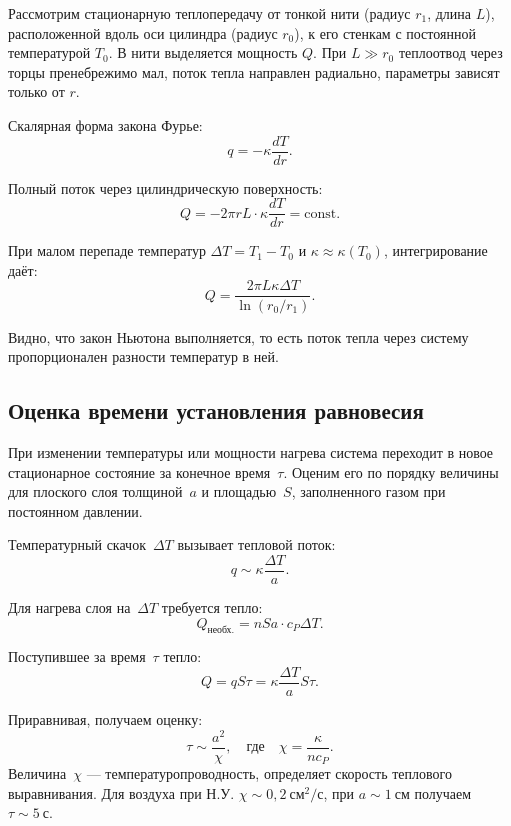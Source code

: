 \documentclass[a4paper,12pt]{article} %
\begin{document}
\medskip

Рассмотрим стационарную теплопередачу от тонкой нити (радиус $r_1$, длина $L$), расположенной вдоль оси цилиндра (радиус $r_0$), к его стенкам с постоянной температурой $T_0$. В нити выделяется мощность $Q$. При $L \gg r_0$ теплоотвод через торцы пренебрежимо мал, поток тепла направлен радиально, параметры зависят только от $r$.

Скалярная форма закона Фурье:
\begin{equation}
    q = -\kappa \frac{dT}{dr}.
\end{equation}

Полный поток через цилиндрическую поверхность:
\begin{equation}
    Q = -2\pi r L \cdot \kappa \frac{dT}{dr} = \text{const}.
\end{equation}

При малом перепаде температур $\Delta T = T_1 - T_0$ и $\kappa \approx \kappa(T_0)$, интегрирование даёт:
\begin{equation}
    Q = \frac{2\pi L \kappa \Delta T}{\ln(r_0 / r_1)}.
\end{equation}

Видно, что закон Ньютона выполняется, то есть поток тепла через систему пропорционален разности температур в
ней.

\subsection*{Оценка времени установления равновесия}

При изменении температуры или мощности нагрева система переходит в новое стационарное состояние за конечное время~$\tau$. Оценим его по порядку величины для плоского слоя толщиной~$a$ и площадью~$S$, заполненного газом при постоянном давлении. 

Температурный скачок~$\Delta T$ вызывает тепловой поток:
\[
q \sim \kappa \frac{\Delta T}{a}.
\]

Для нагрева слоя на~$\Delta T$ требуется тепло:
\[
Q_\text{необх.} = n S a \cdot c_P \Delta T.
\]

Поступившее за время~$\tau$ тепло:
\[
Q = q S \tau = \kappa \frac{\Delta T}{a} S \tau.
\]

Приравнивая, получаем оценку:
\[
\tau \sim \frac{a^2}{\chi}, \quad \text{где} \quad \chi = \frac{\kappa}{n c_P}.
\]
Величина~$\chi$ — температуропроводность, определяет скорость теплового выравнивания. Для воздуха при Н.У. $\chi \sim 0{,}2~\text{см}^2/\text{с}$, при $a \sim 1~\text{см}$ получаем~$\tau \sim 5~\text{с}$.
\end{document}
